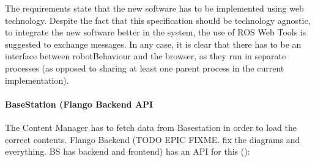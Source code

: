 The requirements state that the new software has to be implemented using web technology. 
Despite the fact that this specification should be technology agnostic, to integrate the new software better in the system, the use of ROS Web Tools is suggested to exchange messages.
In any case, it is clear that there has to be an interface between robotBehaviour and the browser, as they run in separate processes (as opposed to sharing at least one parent process in the current implementation).

\paragraph{BaseStation (Flango Backend API} The Content Manager has to fetch data from Basestation in order to load the correct contents.
Flango Backend (TODO EPIC FIXME. fix the diagrams and everything. BS has backend and frontend) has an API for this ():

